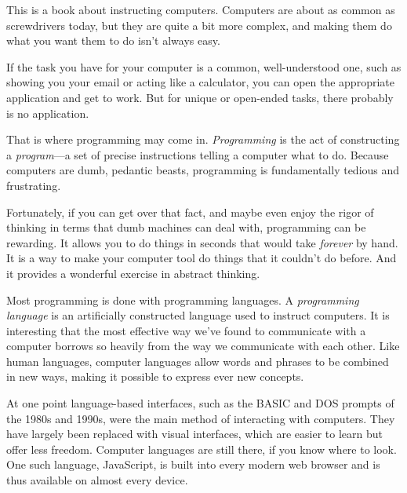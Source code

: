 \label{intro}


This is a book about instructing computers. Computers are about as common as screwdrivers today, but they are quite a bit more complex, and making them do what you want them to do isn't always easy.

If the task you have for your computer is a common, well-understood one, such as showing you your email or acting like a calculator, you can open the appropriate application and get to work. But for unique or open-ended tasks, there probably is no application.

That is where programming may come in. \emph{Programming} is the act of constructing a \emph{program}—a set of precise instructions telling a computer what to do. Because computers are dumb, pedantic beasts, programming is fundamentally tedious and frustrating.

Fortunately, if you can get over that fact, and maybe even enjoy the rigor of thinking in terms that dumb machines can deal with, programming can be rewarding. It allows you to do things in seconds that would take \emph{forever} by hand. It is a way to make your computer tool do things that it couldn't do before. And it provides a wonderful exercise in abstract thinking.

Most programming is done with programming languages. A \emph{programming language} is an artificially constructed language used to instruct computers. It is interesting that the most effective way we've found to communicate with a computer borrows so heavily from the way we communicate with each other. Like human languages, computer languages allow words and phrases to be combined in new ways, making it possible to express ever new concepts.

At one point language-based interfaces, such as the BASIC and DOS prompts of the 1980s and 1990s, were the main method of interacting with computers. They have largely been replaced with visual interfaces, which are easier to learn but offer less freedom. Computer languages are still there, if you know where to look. One such language, JavaScript, is built into every modern web browser and is thus available on almost every device.


